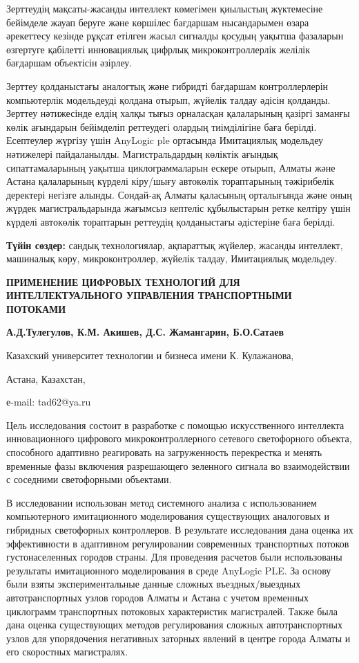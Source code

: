 Зерттеудің мақсаты-жасанды интеллект көмегімен қиылыстың жүктемесіне
бейімделе жауап беруге және көршілес бағдаршам нысандарымен өзара
әрекеттесу кезінде рұқсат етілген жасыл сигналды қосудың уақытша
фазаларын өзгертуге қабілетті инновациялық цифрлық микроконтроллерлік
желілік бағдаршам объектісін әзірлеу.

Зерттеу қолданыстағы аналогтық және гибридті бағдаршам контроллерлерін
компьютерлік модельдеуді қолдана отырып, жүйелік талдау әдісін қолданды.
Зерттеу нәтижесінде елдің халқы тығыз орналасқан қалаларының қазіргі
заманғы көлік ағындарын бейімделіп реттеудегі олардың тиімділігіне баға
берілді. Есептеулер жүргізу үшін AnyLogic ple ортасында Имитациялық
модельдеу нәтижелері пайдаланылды. Магистральдардың көліктік ағындық
сипаттамаларының уақытша циклограммаларын ескере отырып, Алматы және
Астана қалаларының күрделі кіру/шығу автокөлік тораптарының тәжірибелік
деректері негізге алынды. Сондай-ақ Алматы қаласының орталығында және
оның жүрдек магистральдарында жағымсыз кептеліс құбылыстарын ретке
келтіру үшін күрделі автокөлік тораптарын реттеудің қолданыстағы
әдістеріне баға берілді.

{\bfseries Түйін сөздер:} сандық технологиялар, ақпараттық жүйелер, жасанды
интеллект, машиналық көру, микроконтроллер, жүйелік талдау, Имитациялық
модельдеу.
\newpage
\begin{center}
{\large\bfseries ПРИМЕНЕНИЕ ЦИФРОВЫХ ТЕХНОЛОГИЙ ДЛЯ ИНТЕЛЛЕКТУАЛЬНОГО УПРАВЛЕНИЯ
ТРАНСПОРТНЫМИ ПОТОКАМИ}

{\bfseries А.Д.Тулегулов, К.М. Акишев, Д.С. Жамангарин, Б.О.Сатаев}

Казахский университет технологии и бизнеса имени К. Кулажанова,

Астана, Казахстан,

е-mail: tad62@ya.ru
\end{center}

Цель исследования состоит в разработке с помощью искусственного
интеллекта инновационного цифрового микроконтроллерного сетевого
светофорного объекта, способного адаптивно реагировать на загруженность
перекрестка и менять временные фазы включения разрешающего зеленного
сигнала во взаимодействии с соседними светофорными объектами.

В исследовании использован метод системного анализа с использованием
компьютерного имитационного моделирования существующих аналоговых и
гибридных светофорных контроллеров. В результате исследования дана
оценка их эффективности в адаптивном регулировании современных
транспортных потоков густонаселенных городов страны. Для проведения
расчетов были использованы результаты имитационного моделирования в
среде AnyLogic PLE. За основу были взяты экспериментальные данные
сложных въездных/выездных автотранспортных узлов городов Алматы и Астана
с учетом временных циклограмм транспортных потоковых характеристик
магистралей. Также была дана оценка существующих методов регулирования
сложных автотранспортных узлов для упорядочения негативных заторных
явлений в центре города Алматы и его скоростных магистралях.

